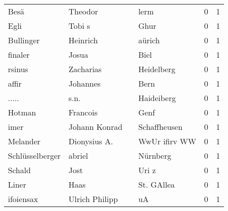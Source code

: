 \begin{center}
\begin{tiny}
\begin{longtabu}{llllrr}
                     Besä &                            Theodor &             &                                        lerm &          0 &         1 \\
                     Egli &                             Tobi s &             &                                        Ghur &          0 &         1 \\
                Bullinger &                           Heinrich &             &                                      aürich &          0 &         1 \\
                  finaler &                              Josua &             &                                        Biel &          0 &         1 \\
                   rsinus &                          Zacharias &             &                                  Heidelberg &          0 &         1 \\
                    affir &                           Johannes &             &                                        Bern &          0 &         1 \\
                    ..... &                               s.n. &             &                                  Haideiberg &          0 &         1 \\
                   Hotman &                           Francois &             &                                        Genf &          0 &         1 \\
                     imer &                      Johann Konrad &             &                                Schaffheusen &          0 &         1 \\
                 Melander &                       Dionysius A. &             &                               WwUr ifirv WW &          0 &         1 \\
          Schlüsselberger &                             abriel &             &                                    Nürnberg &          0 &         1 \\
                   Schald &                               Jost &             &                                       Uri z &          0 &         1 \\
                    Liner &                               Haas &             &                                  St. GAllea &          0 &         1 \\
                ifoiensax &                     Ulrich Philipp &             &                                          uA &          0 &         1 \\

\end{longtabu}
\end{tiny}
\end{center}
